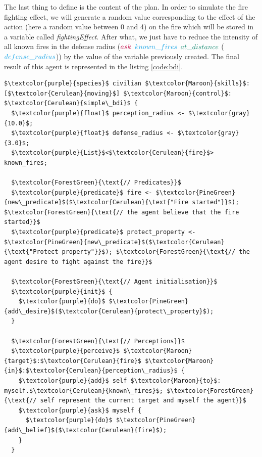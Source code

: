 \documentclass[12pt, a4paper]{memoir} %
\begin{document}
			The last thing to define is the content of the plan. In order to simulate the fire fighting effect, we will generate a random value corresponding to
			the effect of the action (here a random value between 0 and 4) on the fire which will be stored in a variable called \textit{fightingEffect}. After what,
			we just have to reduce the intensity of all known fires in the defense radius ($\textcolor{purple}{ask}$ $\textcolor{Cerulean}{known\_fires}$ $\textcolor{PineGreen}{at\_distance}$ ($\textcolor{Cerulean}{defense\_radius}$))
			by the value of the variable previously created. The final result of this agent is represented in the listing \ref{code:bdi}.

			\begin{lstlisting}[mathescape,caption=Exemple of BDI agent.,label=code:bdi]
$\textcolor{purple}{species}$ civilian $\textcolor{Maroon}{skills}$:[$\textcolor{Cerulean}{moving}$] $\textcolor{Maroon}{control}$: $\textcolor{Cerulean}{simple\_bdi}$ {
  $\textcolor{purple}{float}$ perception_radius <- $\textcolor{gray}{10.0}$;
  $\textcolor{purple}{float}$ defense_radius <- $\textcolor{gray}{3.0}$;
  $\textcolor{purple}{List}$<$\textcolor{Cerulean}{fire}$> known_fires;

  $\textcolor{ForestGreen}{\text{// Predicates}}$
  $\textcolor{purple}{predicate}$ fire <- $\textcolor{PineGreen}{new\_predicate}$($\textcolor{Cerulean}{\text{"Fire started"}}$); $\textcolor{ForestGreen}{\text{// the agent believe that the fire started}}$
  $\textcolor{purple}{predicate}$ protect_property <- $\textcolor{PineGreen}{new\_predicate}$($\textcolor{Cerulean}{\text{"Protect property"}}$); $\textcolor{ForestGreen}{\text{// the agent desire to fight against the fire}}$

  $\textcolor{ForestGreen}{\text{// Agent initialisation}}$
  $\textcolor{purple}{init}$ {
    $\textcolor{purple}{do}$ $\textcolor{PineGreen}{add\_desire}$($\textcolor{Cerulean}{protect\_property}$);
  }

  $\textcolor{ForestGreen}{\text{// Perceptions}}$
  $\textcolor{purple}{perceive}$ $\textcolor{Maroon}{target}$:$\textcolor{Cerulean}{fire}$ $\textcolor{Maroon}{in}$:$\textcolor{Cerulean}{perception\_radius}$ {
    $\textcolor{purple}{add}$ self $\textcolor{Maroon}{to}$: myself.$\textcolor{Cerulean}{known\_fires}$; $\textcolor{ForestGreen}{\text{// self represent the current target and myself the agent}}$
    $\textcolor{purple}{ask}$ myself {
      $\textcolor{purple}{do}$ $\textcolor{PineGreen}{add\_belief}$($\textcolor{Cerulean}{fire}$);
    }
  }


\end{lstlisting}
\end{document}
